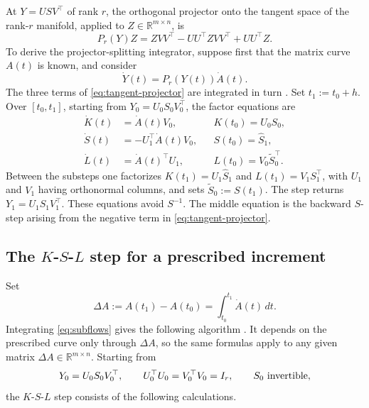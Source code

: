 \documentclass[]{article}
\numberwithin{equation}{section}
\theoremstyle{plain}
\theoremstyle{remark}
\numberwithin{algorithm}{section}
\newcommand{\R}{\mathbb{R}}
\begin{document}
At \(Y=USV^\top\) of rank \(r\), the orthogonal projector onto the tangent
space of the rank-\(r\) manifold, applied to \(Z\in\R^{m\times n}\), is
\begin{equation}\label{eq:tangent-projector}
 P_r(Y)Z=ZVV^\top-UU^\top ZVV^\top+UU^\top Z.
\end{equation}
To derive the projector-splitting integrator, suppose first that the
matrix curve \(A(t)\) is known, and consider
\begin{equation}\label{eq:prescribed-curve-dlra}
 \dot Y(t)=P_r(Y(t))\dot A(t).
\end{equation}
The three terms of \eqref{eq:tangent-projector} are integrated in turn
\cite{LubichOseledets2014}.  Set \(t_1:=t_0+h\).  Over \([t_0,t_1]\),
starting from \(Y_0=U_0S_0V_0^\top\), the factor equations are
\begin{equation}\label{eq:subflows}
 \begin{aligned}
  \dot K(t)&=\dot A(t)V_0,
  &&K(t_0)=U_0S_0,\\
  \dot S(t)&=-U_1^\top\dot A(t)V_0,
  &&S(t_0)=\widehat S_1,\\
  \dot L(t)&=\dot A(t)^\top U_1,
  &&L(t_0)=V_0\widetilde S_0^\top.
 \end{aligned}
\end{equation}
Between the substeps one factorizes \(K(t_1)=U_1\widehat S_1\) and
\(L(t_1)=V_1S_1^\top\), with \(U_1\) and \(V_1\) having orthonormal
columns, and sets \(\widetilde S_0:=S(t_1)\).  The step returns
\(Y_1=U_1S_1V_1^\top\).  These equations avoid \(S^{-1}\).
The middle equation is the backward \(S\)-step arising from the negative
term in \eqref{eq:tangent-projector}.

\subsection{The \texorpdfstring{\(K\)-\(S\)-\(L\)}{K-S-L} step for a prescribed increment}
\label{sec:practical-step}

Set
\begin{equation}\label{eq:exact-matrix-increment}
 \Delta A:=A(t_1)-A(t_0)=\int_{t_0}^{t_1}\dot A(t)\,dt.
\end{equation}
Integrating \eqref{eq:subflows} gives the following algorithm
\cite{LubichOseledets2014}.  It depends on the prescribed curve only through
\(\Delta A\), so the same formulas apply to any given matrix
\(\Delta A\in\R^{m\times n}\).  Starting from
\begin{equation}\label{eq:ksl-start}
 Y_0=U_0S_0V_0^\top,\qquad U_0^\top U_0=V_0^\top V_0=I_r,
 \qquad S_0\ \hbox{invertible},
\end{equation}
the \(K\)-\(S\)-\(L\) step consists of the following calculations.
\end{document}
